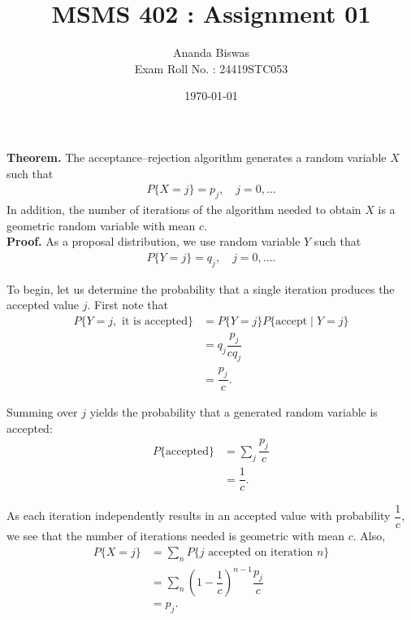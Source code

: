 \documentclass[11pt, a4paper]{article}
\title{MSMS 402 : Assignment 01}
\author{{\fontsize{25}{20} \benyorithafont Ananda Biswas} \\[1em] Exam Roll No. : 24419STC053}
\date{\today}
\begin{document}
\maketitle

\textbf{Theorem.} The acceptance--rejection algorithm generates a random variable $X$ such that
\begin{align*}
P\{X = j\} = p_j, \quad j = 0, \ldots
\end{align*}
In addition, the number of iterations of the algorithm needed to obtain $X$ is a geometric random variable with mean $c$. \\[1em]

\textbf{Proof.} As a proposal distribution, we use random variable $Y$ such that
\begin{align*}
P\{Y = j\} = q_j, \quad j = 0, \ldots.
\end{align*}

To begin, let us determine the probability that a single iteration produces the accepted value $j$. First note that
\begin{align*}
P\{Y = j, \text{ it is accepted}\}
&= P\{Y = j\} P\{\text{accept} \mid Y = j\} \\[0.5em]
&= q_j \dfrac{p_j}{c q_j} \\[0.5em]
&= \dfrac{p_j}{c}.
\end{align*}

Summing over $j$ yields the probability that a generated random variable is accepted:
\begin{align*}
P\{\text{accepted}\}
&= \sum_j \dfrac{p_j}{c} \\[0.5em]
&= \dfrac{1}{c}.
\end{align*}

As each iteration independently results in an accepted value with probability $\dfrac{1}{c}$, we see that the number of iterations needed is geometric with mean $c$. Also,
\begin{align*}
P\{X = j\}
&= \sum_n P\{\text{$j$ accepted on iteration $n$}\} \\[0.5em]
&= \sum_n \left(1 - \dfrac{1}{c}\right)^{n-1} \dfrac{p_j}{c} \\[0.5em]
&= p_j.
\end{align*}

\flushright{\Box}
\end{document}
